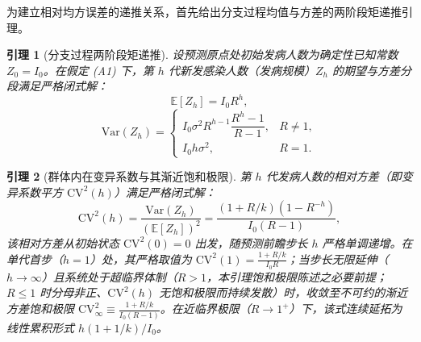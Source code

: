 \documentclass[11pt,a4paper]{article}
\theoremstyle{plain}
\newtheorem{lemma}{引理}
\theoremstyle{definition}
\begin{document}
为建立相对均方误差的递推关系，首先给出分支过程均值与方差的两阶段矩递推引理。

\begin{lemma}[分支过程两阶段矩递推]\label{lem:branch_moments}
设预测原点处初始发病人数为确定性已知常数 $Z_0 = I_0$。在假定 (A1) 下，第 $h$ 代新发感染人数（发病规模）$Z_h$ 的期望与方差分段满足严格闭式解：
\begin{equation}
\mathbb{E}[Z_h] = I_0 R^h,
\end{equation}
\begin{equation}
\text{Var}(Z_h) = \begin{cases}
I_0 \sigma^2 R^{h-1} \dfrac{R^h - 1}{R - 1}, & R \neq 1, \\[8pt]
I_0 h \sigma^2, & R = 1.
\end{cases}
\label{eq:lem1_var}
\end{equation}
\end{lemma}


\begin{lemma}[群体内在变异系数与其渐近饱和极限]\label{lem:cv_floor}
第 $h$ 代发病人数的相对方差（即变异系数平方 $\text{CV}^2(h)$）满足严格闭式解：
\begin{equation}
\text{CV}^2(h) = \frac{\text{Var}(Z_h)}{(\mathbb{E}[Z_h])^2} = \frac{(1 + R/k)(1 - R^{-h})}{I_0(R - 1)},
\label{eq:cv_floor}
\end{equation}
该相对方差从初始状态 $\text{CV}^2(0)=0$ 出发，随预测前瞻步长 $h$ 严格单调递增。在单代首步（$h=1$）处，其严格取值为 $\text{CV}^2(1) = \frac{1+R/k}{I_0 R}$；当步长无限延伸（$h \to \infty$）且系统处于超临界体制（$R > 1$，本引理饱和极限陈述之必要前提；$R\le1$ 时分母非正、$\text{CV}^2(h)$ 无饱和极限而持续发散）时，收敛至不可约的渐近方差饱和极限 $\text{CV}^2_\infty \equiv \frac{1 + R/k}{I_0(R - 1)}$。在近临界极限（$R \to 1^+$）下，该式连续延拓为线性累积形式 $h(1+1/k)/I_0$。
\end{lemma}

\end{document}
